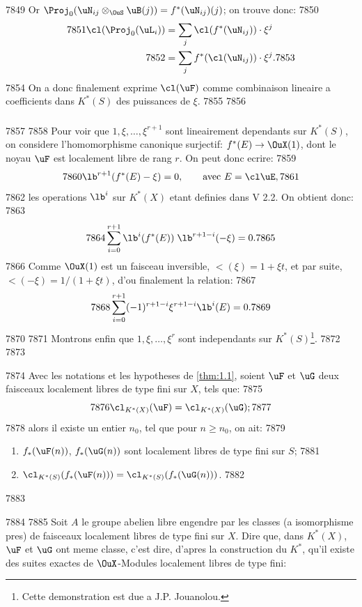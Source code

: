   7849	Or $\Proj_0(\uN_{ij} \otimes_{\OuS} \uB(j)) = f^*(\uN_{ij})(j)$; on trouve donc:
  7850	\begin{align*}
  7851	\cl(\Proj_0(\uL_i)) &= \sum_j \cl(f^*(\uN_{ij})) \cdot \xi^j \\
  7852	&= \sum_j f^*(\cl(\uN_{ij})) \cdot \xi^j.
  7853	\end{align*}
  7854	On a donc finalement exprime $\cl(\uF)$ comme combinaison lineaire a coefficients dans $K^*(S)$ des puissances de $\xi$.
  7855	
  7856	\subsubsection{}
  7857	
  7858	Pour voir que $1, \xi, \ldots, \xi^{r+1}$ sont lineairement dependants sur $K^*(S)$, on considere l'homomorphisme canonique surjectif: $f^*(E) \to \OuX(1)$, dont le noyau $\uF$ est localement libre de rang $r$. On peut donc ecrire:
  7859	\[
  7860	\lb^{r+1}(f^*(E) - \xi) = 0, \qquad \text{avec } E = \cl\uE,
  7861	\]
  7862	les operations $\lb^i$ sur $K^*(X)$ etant definies dans V 2.2. On obtient donc:
  7863	\[
  7864	\sum_{i=0}^{r+1} \lb^i(f^*(E))\; \lb^{r+1-i}(-\xi) = 0.
  7865	\]
  7866	Comme $\OuX(1)$ est un faisceau inversible, $\lt(\xi) = 1+\xi t$, et par suite, $\lt(-\xi) = 1/(1+\xi t)$, d'ou finalement la relation:
  7867	\begin{equation}\label{eq:1.9.1}
  7868	\sum_{i=0}^{r+1} (-1)^{r+1-i} \xi^{r+1-i} \lb^i(E) = 0.
  7869	\end{equation}
  7870	
  7871	Montrons enfin que $1, \xi, \ldots, \xi^r$ sont independants sur $K^*(S)$\footnote{Cette demonstration est due a J.P. Jouanolou.}.
  7872	
  7873	\begin{lem}[1.10]
  7874	Avec les notations et les hypotheses de \ref{thm:1.1}, soient $\uF$ et $\uG$ deux faisceaux localement libres de type fini sur $X$, tels que:
  7875	\[
  7876	\cl_{K^*(X)}(\uF) = \cl_{K^*(X)}(\uG);
  7877	\]
  7878	alors il existe un entier $n_0$, tel que pour $n \geqslant n_0$, on ait:
  7879	\begin{enumerate}[label=\roman*)]
  7880	\item $f_*(\uF(n))$, $f_*(\uG(n))$ sont localement libres de type fini sur $S$;
  7881	\item $\cl_{K^*(S)}(f_*(\uF(n))) = \cl_{K^*(S)}(f_*(\uG(n)))$.
  7882	\end{enumerate}
  7883	\end{lem}
  7884	
  7885	Soit $A$ le groupe abelien libre engendre par les classes (a isomorphisme pres) de faisceaux localement libres de type fini sur $X$. Dire que, dans $K^*(X)$, $\uF$ et $\uG$ ont meme classe, c'est dire, d'apres la construction du $K^*$, qu'il existe des suites exactes de $\OuX$-Modules localement libres de type fini:
